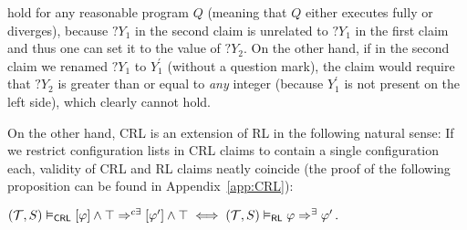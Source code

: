 hold for any reasonable program $Q$ (meaning that $Q$ either executes fully or diverges),
because $?Y_1$ in the second claim is unrelated to $?Y_1$ in the first claim and thus one can set it to
the value of $?Y_2$.
On the other hand, if in the second claim we renamed $?Y_1$ to $Y_1^\prime$ (without a question mark),
the claim would require that $?Y_2$ is greater than or equal to \emph{any} integer (because $Y_1^\prime$ is not present on the left side),
which clearly cannot hold.

On the other hand, CRL is an extension of RL in the following natural sense:
If we restrict configuration lists in CRL claims to contain a single
configuration each, validity of CRL and RL claims neatly coincide
(the proof of the following proposition can be found in Appendix~\ref{app:CRL}):


\begin{proposition}\label{prop:opCRLopRL}
  $ (\mathcal{T}, S) \vDash_{\mathsf{CRL}} [\varphi] \land \top \Rightarrow^{c\exists}
  [\varphi^\prime] \land \top \iff (\mathcal{T}, S) \vDash_{\mathsf{RL}} \varphi
  \Rightarrow^{\exists} \varphi^\prime \, .  $
\end{proposition}


